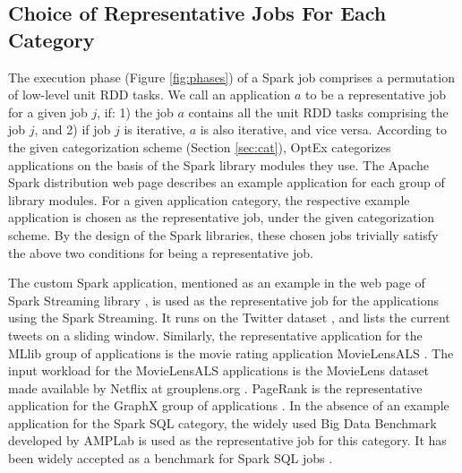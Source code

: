 \documentclass[conference]{IEEEtran}
\begin{document}
 \subsection{Choice of Representative Jobs For Each Category} \label{sec:rep}
     The execution phase (Figure \ref{fig:phases}) of a Spark job comprises a permutation of low-level unit RDD tasks. We call an application $a$ to be a representative job  for a given job $j$, if:
1) the job $a$ contains all the
 unit RDD tasks comprising the job $j$,
 and 2) if job $j$ is iterative, $a$ is also iterative, and vice versa. According to the given categorization scheme (Section \ref{sec:cat}), OptEx categorizes applications
     on the basis of the Spark library modules they use. The Apache Spark distribution web page \cite{apache:library1234} describes an
     example application for each group of library modules. For a given application category, the respective example application is chosen as the representative job, under the given categorization scheme. By the design of the Spark libraries, these chosen jobs trivially satisfy the above two conditions for being a representative job.
     \par The custom Spark application, mentioned as an example
     in the web page of Spark Streaming library \cite{apache:library1234}, is used as the representative job for the applications using the Spark Streaming.
     It runs on the Twitter dataset \cite{Zafarani+Liu:2009}
, and lists the current tweets on a sliding window. Similarly, the representative application for the MLlib group of applications is the movie rating application MovieLensALS \cite{apache:library1234}. The input workload for the MovieLensALS applications is the
MovieLens dataset made available by Netflix at grouplens.org \cite{MOVIELENS-DATA}. PageRank is the representative application for the GraphX group of applications \cite{apache:library1234}.
 In the absence of an example application for the Spark SQL category, the widely used Big Data Benchmark \cite{amplab:benchmark7890} developed by AMPLab is used as the representative job for this category. It has been widely accepted as a benchmark for Spark SQL jobs \cite{apache:library1234}. 





\newtheorem{definition}{Definition}
\newcommand{\argmax}{\arg\!\max}
\newcommand{\card}[1]{\ensuremath{\left\|#1\right\|}}
\def\tuple#1{\langle #1\rangle}
\newcommand{\bigslant}[2]{{\raisebox{.2em}{$#1$}\left/\raisebox{-.2em}{$#2$}\right.}}
\end{document}
